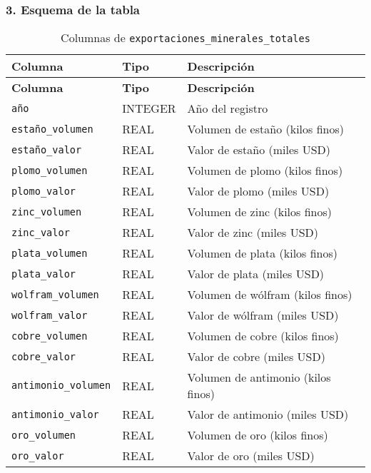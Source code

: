 \documentclass[12pt,a4paper]{article}
\begin{document}
\subsubsection*{3. Esquema de la tabla}
\begin{longtable}{@{}lll@{}}
\caption{Columnas de \texttt{exportaciones\_minerales\_totales}}\\
\toprule
\textbf{Columna}             & \textbf{Tipo} & \textbf{Descripción} \\
\midrule
\endfirsthead
\toprule
\textbf{Columna}             & \textbf{Tipo} & \textbf{Descripción} \\
\midrule
\endhead
\bottomrule
\endfoot
\texttt{año}                  & INTEGER & Año del registro \\
\texttt{estaño\_volumen}      & REAL    & Volumen de estaño (kilos finos) \\
\texttt{estaño\_valor}        & REAL    & Valor de estaño (miles USD) \\
\texttt{plomo\_volumen}       & REAL    & Volumen de plomo (kilos finos) \\
\texttt{plomo\_valor}         & REAL    & Valor de plomo (miles USD) \\
\texttt{zinc\_volumen}        & REAL    & Volumen de zinc (kilos finos) \\
\texttt{zinc\_valor}          & REAL    & Valor de zinc (miles USD) \\
\texttt{plata\_volumen}       & REAL    & Volumen de plata (kilos finos) \\
\texttt{plata\_valor}         & REAL    & Valor de plata (miles USD) \\
\texttt{wolfram\_volumen}     & REAL    & Volumen de wólfram (kilos finos) \\
\texttt{wolfram\_valor}       & REAL    & Valor de wólfram (miles USD) \\
\texttt{cobre\_volumen}       & REAL    & Volumen de cobre (kilos finos) \\
\texttt{cobre\_valor}         & REAL    & Valor de cobre (miles USD) \\
\texttt{antimonio\_volumen}   & REAL    & Volumen de antimonio (kilos finos) \\
\texttt{antimonio\_valor}     & REAL    & Valor de antimonio (miles USD) \\
\texttt{oro\_volumen}         & REAL    & Volumen de oro (kilos finos) \\
\texttt{oro\_valor}           & REAL    & Valor de oro (miles USD) \\
\end{longtable}
\end{document}
